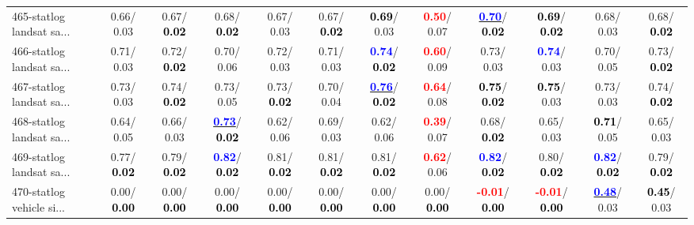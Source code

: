 \begin{table}[h]
\begin{center}
{\begin{tabular}{lc|c|c|c|c|c|c|c|c|c|c}
465-statlog landsat sa... &   0.66/  0.03 &   0.67/\textcolor{black}{\textbf{  0.02}} &   0.68/\textcolor{black}{\textbf{  0.02}} &   0.67/  0.03 &   0.67/\textcolor{black}{\textbf{  0.02}} & \textcolor{black}{\textbf{  0.69}}/  0.03 & \textcolor{red}{\textbf{  0.50}}/  0.07 & \underline{\textcolor{blue}{\textbf{  0.70}}}/\textcolor{black}{\textbf{  0.02}} & \textcolor{black}{\textbf{  0.69}}/\textcolor{black}{\textbf{  0.02}} &   0.68/  0.03 &   0.68/\textcolor{black}{\textbf{  0.02}} \\
466-statlog landsat sa... &   0.71/  0.03 &   0.72/\textcolor{black}{\textbf{  0.02}} &   0.70/  0.06 &   0.72/  0.03 &   0.71/  0.03 & \textcolor{blue}{\textbf{  0.74}}/\textcolor{black}{\textbf{  0.02}} & \textcolor{red}{\textbf{  0.60}}/  0.09 &   0.73/  0.03 & \textcolor{blue}{\textbf{  0.74}}/  0.03 &   0.70/  0.05 &   0.73/\textcolor{black}{\textbf{  0.02}} \\
467-statlog landsat sa... &   0.73/  0.03 &   0.74/\textcolor{black}{\textbf{  0.02}} &   0.73/  0.05 &   0.73/\textcolor{black}{\textbf{  0.02}} &   0.70/  0.04 & \underline{\textcolor{blue}{\textbf{  0.76}}}/\textcolor{black}{\textbf{  0.02}} & \textcolor{red}{\textbf{  0.64}}/  0.08 & \textcolor{black}{\textbf{  0.75}}/\textcolor{black}{\textbf{  0.02}} & \textcolor{black}{\textbf{  0.75}}/  0.03 &   0.73/  0.03 &   0.74/\textcolor{black}{\textbf{  0.02}} \\
468-statlog landsat sa... &   0.64/  0.05 &   0.66/  0.03 & \underline{\textcolor{blue}{\textbf{  0.73}}}/\textcolor{black}{\textbf{  0.02}} &   0.62/  0.06 &   0.69/  0.03 &   0.62/  0.06 & \textcolor{red}{\textbf{  0.39}}/  0.07 &   0.68/\textcolor{black}{\textbf{  0.02}} &   0.65/  0.03 & \textcolor{black}{\textbf{  0.71}}/  0.05 &   0.65/  0.03 \\
469-statlog landsat sa... &   0.77/\textcolor{black}{\textbf{  0.02}} &   0.79/\textcolor{black}{\textbf{  0.02}} & \textcolor{blue}{\textbf{  0.82}}/\textcolor{black}{\textbf{  0.02}} &   0.81/\textcolor{black}{\textbf{  0.02}} &   0.81/\textcolor{black}{\textbf{  0.02}} &   0.81/\textcolor{black}{\textbf{  0.02}} & \textcolor{red}{\textbf{  0.62}}/  0.06 & \textcolor{blue}{\textbf{  0.82}}/\textcolor{black}{\textbf{  0.02}} &   0.80/\textcolor{black}{\textbf{  0.02}} & \textcolor{blue}{\textbf{  0.82}}/\textcolor{black}{\textbf{  0.02}} &   0.79/\textcolor{black}{\textbf{  0.02}} \\ \hline
470-statlog vehicle si... &   0.00/\textcolor{black}{\textbf{  0.00}} &   0.00/\textcolor{black}{\textbf{  0.00}} &   0.00/\textcolor{black}{\textbf{  0.00}} &   0.00/\textcolor{black}{\textbf{  0.00}} &   0.00/\textcolor{black}{\textbf{  0.00}} &   0.00/\textcolor{black}{\textbf{  0.00}} &   0.00/\textcolor{black}{\textbf{  0.00}} & \textcolor{red}{\textbf{ -0.01}}/\textcolor{black}{\textbf{  0.00}} & \textcolor{red}{\textbf{ -0.01}}/\textcolor{black}{\textbf{  0.00}} & \underline{\textcolor{blue}{\textbf{  0.48}}}/  0.03 & \textcolor{black}{\textbf{  0.45}}/  0.03 \\

\end{tabular}}
\end{center}
\end{table}
